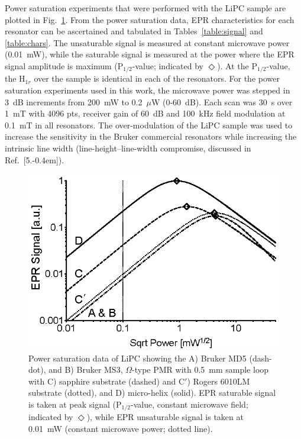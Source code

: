 Power saturation experiments that were performed with the LiPC sample are plotted in Fig.~\ref{fig:lipcpwrsat}. From the power saturation data, EPR characteristics for each resonator can be ascertained and tabulated in Tables~\ref{table:signal} and \ref{table:chars}. The unsaturable signal is measured at constant microwave power (0.01~mW), while the saturable signal is measured at the power where the EPR signal amplitude is maximum (P$_{1/2}$-value; indicated by $\Diamond$). At the P$_{1/2}$-value, the H$_{1r}$ over the sample is identical in each of the resonators. For the power saturation experiments used in this work, the microwave power was stepped in 3~dB increments from 200~mW to 0.2~$\mu$W (0-60~dB). Each scan was 30~s over 1~mT with 4096 pts, receiver gain of 60~dB and 100~kHz field modulation at 0.1~mT in all resonators. The over-modulation of the LiPC sample was used to increase the sensitivity in the Bruker commercial resonators while increasing the intrinsic line width (line-height--line-width compromise, discussed in Ref.~[5.\kern-0.4em]). 

\begin{figure}[htb]
\centering
\includegraphics{Kapitel/Appendix/Images/S4-LiPCPowerSat.eps}
\caption[Power saturation data of LiPC comparing resonators.]{Power saturation data of LiPC showing the A) Bruker MD5 (dash-dot), and B) Bruker MS3, $\Omega$-type PMR with 0.5~mm sample loop with C) sapphire substrate (dashed) and C$'$) Rogers 6010LM substrate (dotted), and D) micro-helix (solid). EPR saturable signal is taken at peak signal (P$_{1/2}$-value, constant microwave field; indicated by $\Diamond$), while EPR unsaturable signal is taken at 0.01~mW (constant microwave power; dotted line).}
\label{fig:lipcpwrsat}
\end{figure}


